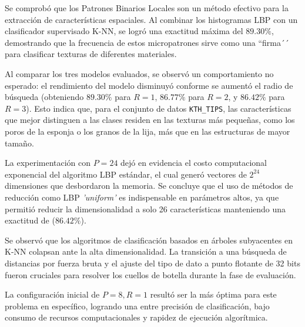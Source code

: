 
Se comprobó que los Patrones Binarios Locales son un método efectivo para la 
extracción de características espaciales. Al combinar los histogramas LBP con un 
clasificador supervisado K-NN, se logró una exactitud máxima del $89.30\%$, demostrando 
que la frecuencia de estos micropatrones sirve como una ``firma´´ para clasificar 
texturas de diferentes materiales.

Al comparar los tres modelos evaluados, se observó un comportamiento no esperado: 
el rendimiento del modelo disminuyó conforme se aumentó el radio de búsqueda 
(obteniendo $89.30\%$ para $R=1$, $86.77\%$ para $R=2$, y $86.42\%$ para $R=3$). 
Esto indica que, para el conjunto de datos \texttt{KTH\_TIPS}, las características 
que mejor distinguen a las clases residen en las texturas más pequeñas, como los poros 
de la esponja o los granos de la lija, más que en las estructuras de mayor tamaño. 

La experimentación con $P=24$ dejó en evidencia el costo computacional exponencial 
del algoritmo LBP estándar, el cual generó vectores de $2^{24}$ dimensiones que 
desbordaron la memoria. Se concluye que el uso de métodos de reducción como LBP 
\textit{'uniform'} es indispensable en parámetros altos, ya que permitió reducir la 
dimensionalidad a solo 26 características manteniendo una exactitud de ($86.42\%$).

Se observó que los algoritmos de clasificación basados en árboles subyacentes en 
K-NN colapsan ante la alta dimensionalidad. La transición a una búsqueda de 
distancias por fuerza bruta y el ajuste del tipo de dato a punto flotante de 32 
bits fueron cruciales para resolver los cuellos de botella durante la fase de evaluación.

La configuración inicial de $P=8, R=1$ resultó ser la más óptima para este problema 
en específico, logrando una entre precisión de clasificación, bajo consumo de recursos 
computacionales y rapidez de ejecución algorítmica.

\QED